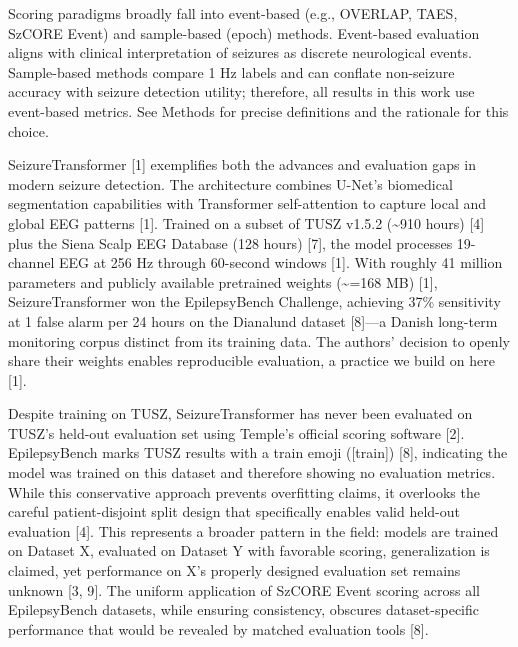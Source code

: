 Scoring paradigms broadly fall into event-based (e.g., OVERLAP, TAES,
SzCORE Event) and sample-based (epoch) methods. Event-based evaluation
aligns with clinical interpretation of seizures as discrete neurological
events. Sample-based methods compare 1 Hz labels and can conflate
non-seizure accuracy with seizure detection utility; therefore, all
results in this work use event-based metrics. See Methods for precise
definitions and the rationale for this choice.

SeizureTransformer {[}1{]} exemplifies both the advances and evaluation
gaps in modern seizure detection. The architecture combines U-Net's
biomedical segmentation capabilities with Transformer self-attention to
capture local and global EEG patterns {[}1{]}. Trained on a subset of
TUSZ v1.5.2 (\textasciitilde910 hours) {[}4{]} plus the Siena Scalp EEG
Database (128 hours) {[}7{]}, the model processes 19-channel EEG at 256
Hz through 60-second windows {[}1{]}. With roughly 41 million parameters
and publicly available pretrained weights (\textasciitilde=168 MB)
{[}1{]}, SeizureTransformer won the EpilepsyBench Challenge, achieving
37\% sensitivity at 1 false alarm per 24 hours on the Dianalund dataset
{[}8{]}---a Danish long-term monitoring corpus distinct from its
training data. The authors' decision to openly share their weights
enables reproducible evaluation, a practice we build on here {[}1{]}.

Despite training on TUSZ, SeizureTransformer has never been evaluated on
TUSZ's held-out evaluation set using Temple's official scoring software
{[}2{]}. EpilepsyBench marks TUSZ results with a train emoji
({[}train{]}) {[}8{]}, indicating the model was trained on this dataset
and therefore showing no evaluation metrics. While this conservative
approach prevents overfitting claims, it overlooks the careful
patient-disjoint split design that specifically enables valid held-out
evaluation {[}4{]}. This represents a broader pattern in the field:
models are trained on Dataset X, evaluated on Dataset Y with favorable
scoring, generalization is claimed, yet performance on X's properly
designed evaluation set remains unknown {[}3, 9{]}. The uniform
application of SzCORE Event scoring across all EpilepsyBench datasets,
while ensuring consistency, obscures dataset-specific performance that
would be revealed by matched evaluation tools {[}8{]}.

